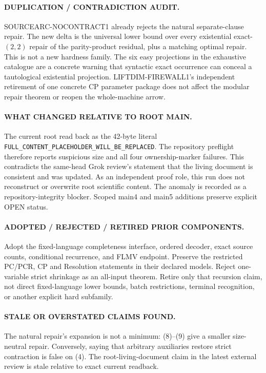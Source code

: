 \documentclass[11pt]{article}
\begin{document}
\paragraph{DUPLICATION / CONTRADICTION AUDIT.}
SOURCEARC-NOCONTRACT1 already rejects the natural separate-clause repair.
The new delta is the universal lower bound over every existential exact-
$(2,2)$ repair of the parity-product residual, plus a matching optimal repair.
This is not a new hardness family.  The six easy projections in the exhaustive
catalogue are a concrete warning that syntactic exact occurrence can conceal
a tautological existential projection.  LIFTDIM-FIREWALL1's independent
retirement of one concrete CP parameter package does not affect the modular
repair theorem or reopen the whole-machine arrow.

\paragraph{WHAT CHANGED RELATIVE TO ROOT MAIN.}
The current root  read back as the 42-byte literal
\texttt{FULL\_CONTENT\_PLACEHOLDER\_WILL\_BE\_REPLACED}.  The repository
preflight therefore reports suspicious size and all four ownership-marker
failures.  This contradicts the same-head Grok review's statement that the
living document is consistent and was updated.  As an independent proof
role, this run does not reconstruct or overwrite root scientific content.
The anomaly is recorded as a repository-integrity blocker.  Scoped main4 and
main5 additions preserve explicit OPEN status.

\paragraph{ADOPTED / REJECTED / RETIRED PRIOR COMPONENTS.}
Adopt the fixed-language completeness interface, ordered decoder, exact
source counts, conditional recurrence, and FLMV endpoint.  Preserve the
restricted PC/PCR, CP and Resolution statements in their declared models.
Reject one-variable strict shrinkage as an all-input theorem.  Retire only
that recursion claim, not direct fixed-language lower bounds, batch
restrictions, terminal recognition, or another explicit hard subfamily.

\paragraph{STALE OR OVERSTATED CLAIMS FOUND.}
The natural repair's expansion is not a minimum: (8)--(9) give a smaller
size-neutral repair.  Conversely, saying that arbitrary auxiliaries restore
strict contraction is false on (4).  The root-living-document claim in the
latest external review is stale relative to exact current readback.
\end{document}
